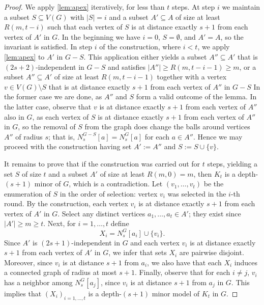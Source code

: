 \begin{proof}
We apply \cref{lem:apex} iteratively, for less than $t$ steps.
At step $i$ we maintain a subset $S\subseteq V(G)$ with $|S|=i$ and a subset $A'\subseteq A$ of size at least $R(m,t-i)$ such that each vertex of $S$ is at distance exactly $s+1$ from each vertex of $A'$ in $G$.
In the beginning we have $i=0$, $S=\emptyset$, and $A'=A$, so the invariant is satisfied.
In step $i$ of the construction, where $i<t$, we apply \cref{lem:apex} to $A'$ in $G-S$.
This application either yields a subset $A''\subseteq A'$ that is $(2s+2)$-independent in $G-S$ and satisfies $|A''|\geq R(m,t-i-1)\geq m$,
or a subset $A''\subseteq A'$ of size at least $R(m,t-i-1)$ together with a vertex $v\in V(G)\setminus S$ that is at distance exactly $s+1$ from each vertex of $A''$ in $G-S$
In the former case we are done, as $A''$ and $S$ form a valid outcome of the lemma.
In the latter case, 
observe that $v$ is at distance exactly $s+1$ from each vertex of $A''$ also in $G$, as each vertex of $S$ is at distance exactly $s+1$ from each vertex of $A''$ in $G$,
so the removal of $S$ from the graph does change the balls around vertices $A''$ of radius $s$; that is, $N^{G-S}_s[a]=N^{G}_s[a]$ for each $a\in A''$.
Hence we may proceed with the construction having set $A':=A''$ and $S:=S\cup \{v\}$.

It remains to prove that if the construction was carried out for $t$ steps, 
yielding a set $S$ of size $t$ and a subset $A'$ of size at least $R(m,0)=m$, then $K_t$ is a depth-$(s+1)$ minor of $G$, which is a contradiction.
Let $(v_1,\ldots,v_t)$ be the enumeration of $S$ in the order of selection: vertex $v_i$ was selected in the $i$-th round.
By the construction, each vertex $v_i$ is at distance exactly $s+1$ from each vertex of $A'$ in $G$.
Select any distinct vertices $a_1,\ldots,a_t\in A'$; they exist since $|A'|\geq m\geq t$.
Next, for $i=1,\ldots,t$ define
$$X_i=N^{G}_s[a_i]\cup \{v_i\}.$$
Since $A'$ is $(2s+1)$-independent in $G$ and each vertex $v_i$ is at distance exactly $s+1$ from each vertex of $A'$ in $G$, we infer that sets $X_i$ are pairwise disjoint.
Moreover, since $v_i$ is at distance $s+1$ from $a_i$, we also have that each $X_i$ induces a connected graph of radius at most $s+1$.
Finally, observe that for each $i\neq j$, $v_i$ has a neighbor among $N^G_s[a_j]$, since $v_i$ is at distance $s+1$ from $a_j$ in $G$.
This implies that $(X_i)_{i=1,\ldots,t}$ is a depth-$(s+1)$ minor model of $K_t$ in $G$.
\end{proof}

